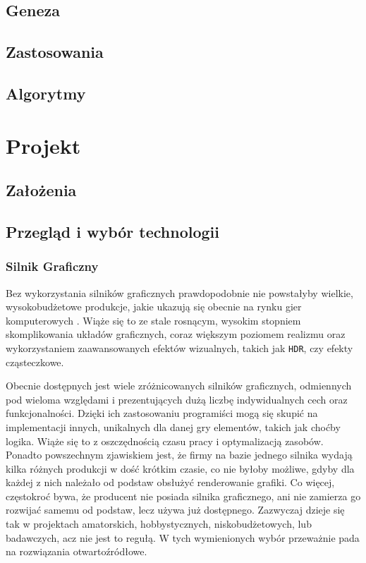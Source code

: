 \documentclass[11pt]{mwrep}
\begin{document}
  \section{Geneza}
  \section{Zastosowania}
  \section{Algorytmy}

\chapter{Projekt}

  \section{Założenia}

  \section{Przegląd i wybór technologii}

    \subsection{Silnik Graficzny}

    Bez wykorzystania silników graficznych prawdopodobnie nie powstałyby wielkie, wy\-so\-ko\-bud\-że\-to\-we produkcje, jakie ukazują się obecnie na rynku gier komputerowych	. Wiąże się to ze stale rosnącym, wysokim stopniem skomplikowania układów graficznych, coraz większym poziomem realizmu oraz wykorzystaniem zaawansowanych efektów wizualnych, takich jak \texttt{HDR}, czy efekty cząsteczkowe. 

    Obecnie dostępnych jest wiele zróżnicowanych silników graficznych, odmiennych pod wieloma względami i prezentujących dużą liczbę indywidualnych cech oraz funkcjonalności. Dzięki ich zastosowaniu programiści mogą się skupić na implementacji innych, unikalnych dla danej gry elementów, takich jak choćby logika. Wiąże się to z oszczędnością czasu pracy i optymalizacją zasobów. Ponadto powszechnym zjawiskiem jest, że firmy na bazie jednego silnika wydają kilka różnych produkcji w dość krótkim czasie, co nie byłoby możliwe, gdyby dla każdej z nich należało od podstaw obsłużyć renderowanie grafiki. Co więcej, częstokroć bywa, że producent nie posiada silnika graficznego, ani nie zamierza go rozwijać samemu od podstaw, lecz używa już dostępnego. Zazwyczaj dzieje się tak w projektach amatorskich, hobbystycznych, niskobudżetowych, lub badawczych, acz nie jest to regułą. W tych wymienionych wybór przeważnie pada na rozwiązania otwartoźródłowe.
\end{document}
